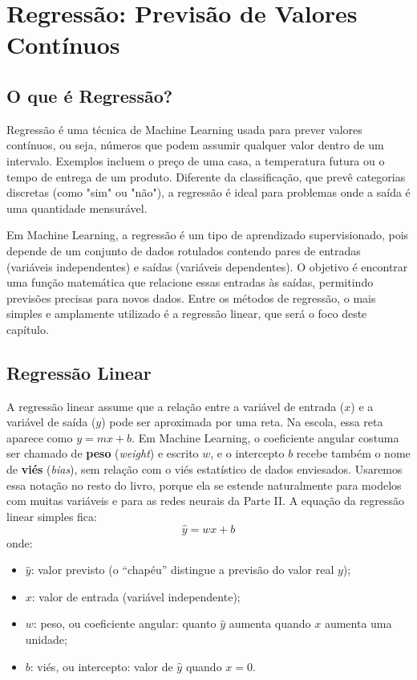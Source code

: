 \documentclass[a4paper,12pt,openany]{book}
\begin{document}
\newpage    

\chapter{Regressão: Previsão de Valores Contínuos}

\section{O que é Regressão?}

Regressão é uma técnica de Machine Learning usada para prever valores contínuos, ou seja, números que podem assumir qualquer valor dentro de um intervalo. Exemplos incluem o preço de uma casa, a temperatura futura ou o tempo de entrega de um produto. Diferente da classificação, que prevê categorias discretas (como "sim" ou "não"), a regressão é ideal para problemas onde a saída é uma quantidade mensurável.

Em Machine Learning, a regressão é um tipo de aprendizado supervisionado, pois depende de um conjunto de dados rotulados contendo pares de entradas (variáveis independentes) e saídas (variáveis dependentes). O objetivo é encontrar uma função matemática que relacione essas entradas às saídas, permitindo previsões precisas para novos dados. Entre os métodos de regressão, o mais simples e amplamente utilizado é a regressão linear, que será o foco deste capítulo.

\section{Regressão Linear}

A regressão linear assume que a relação entre a variável de entrada (\(x\)) e a variável de saída (\(y\)) pode ser aproximada por uma reta. Na escola, essa reta aparece como \(y = mx + b\). Em Machine Learning, o coeficiente angular costuma ser chamado de \textbf{peso} (\textit{weight}) e escrito \(w\), e o intercepto \(b\) recebe também o nome de \textbf{viés} (\textit{bias}), sem relação com o viés estatístico de dados enviesados. Usaremos essa notação no resto do livro, porque ela se estende naturalmente para modelos com muitas variáveis e para as redes neurais da Parte II. A equação da regressão linear simples fica:
\begin{equation}
\hat{y} = wx + b
\end{equation}
onde:
\begin{itemize}
    \item \(\hat{y}\): valor previsto (o ``chapéu'' distingue a previsão do valor real \(y\));
    \item \(x\): valor de entrada (variável independente);
    \item \(w\): peso, ou coeficiente angular: quanto \(\hat{y}\) aumenta quando \(x\) aumenta uma unidade;
    \item \(b\): viés, ou intercepto: valor de \(\hat{y}\) quando \(x = 0\).
\end{itemize}
\end{document}
